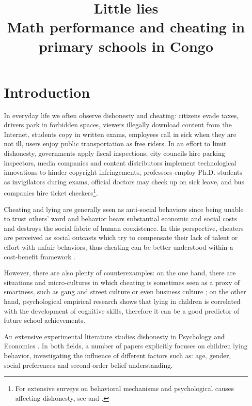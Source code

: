 \documentclass[authoryear, preprint, review, 12pt]{elsarticle}
\begin{document}
\begin{frontmatter}
\title{Little lies \\ Math performance and cheating in primary schools in Congo}

\end{frontmatter}

\section{Introduction}
In everyday life we often observe dishonesty and cheating: citizens evade taxes, drivers park in forbidden spaces, viewers illegally download content from the Internet, students copy in written exams, employees call in sick when they are not ill, users enjoy public transportation as free riders. In an effort to limit dishonesty, governments apply fiscal inspections, city councils hire parking inspectors, media companies and content distributors implement technological innovations to hinder copyright infringements, professors employ Ph.D. students as invigilators during exams, official doctors may check up on sick leave, and bus companies hire ticket checkers\footnote{For extensive surveys on behavioral mechanisms and psychological causes affecting dishonesty, see \cite{ma06} and \cite{jacobsen2018we}.}. 
    
Cheating and lying are generally seen as anti-social behaviors since being unable to trust others' word and behavior bears substantial economic and social costs and destroys the social fabric of human coexistence. In this perspective, cheaters are perceived as social outcasts which try to compensate their lack of talent or effort with unfair behaviors, thus cheating can be better understood within a cost-benefit framework \citep{gtw13,g05}. 

However, there are also plenty of counterexamples: on the one hand, there are situations and micro-cultures in which cheating is sometimes seen as a proxy of smartness, such as gang and street culture \citep{b13} or even business culture \citep{cfm14}; on the other hand, psychological empirical research \citep{vasek1986lying,exl11,el13} shows that lying in children is correlated with the development of cognitive skills, therefore it can be a good predictor of future school achievements. 

An extensive experimental literature studies dishonesty in Psychology \citep{gl15,wsr03,ph99} and Economics \citep{pate2018temptation, kg17,ruffle2017clever,ariely2015true,ff13, hurkens2009,maa08,g05}. In both fields, a number of papers \citep{cantin2016executive,maggian2016social,gl15,el13,ding2014elementary,bucciol2011temptation,bucciol2011luck,talwar2007lying} explicitly focuses on children lying behavior, investigating the influence of different factors such as: age, gender, social preferences and second-order belief understanding. 
\end{document}
